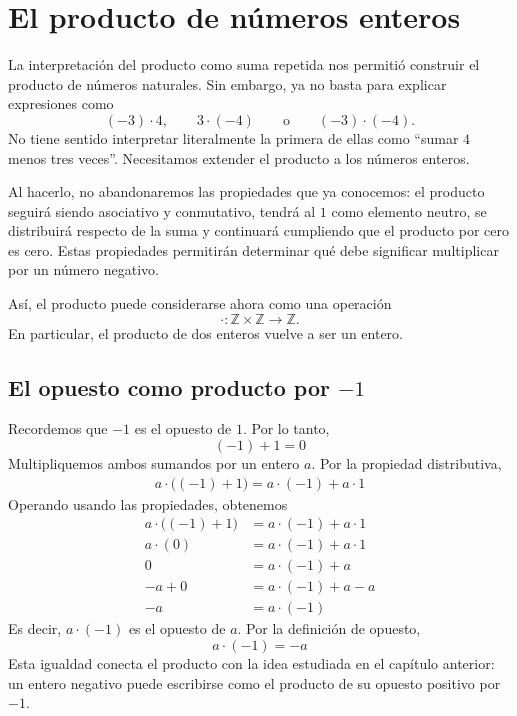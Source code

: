 \section{El producto de números enteros}

La interpretación del producto como suma repetida nos permitió construir el producto de números naturales. Sin embargo, ya no basta para explicar expresiones como
\[
(-3)\cdot4,
\qquad
3\cdot(-4)
\qquad\text{o}\qquad
(-3)\cdot(-4).
\]
No tiene sentido interpretar literalmente la primera de ellas como ``sumar \(4\) menos tres veces''. Necesitamos extender el producto a los números enteros.

Al hacerlo, no abandonaremos las propiedades que ya conocemos: el producto seguirá siendo asociativo y conmutativo, tendrá al \(1\) como elemento neutro, se distribuirá respecto de la suma y continuará cumpliendo que el producto por cero es cero. Estas propiedades permitirán determinar qué debe significar multiplicar por un número negativo.

Así, el producto puede considerarse ahora como una operación
\[
\cdot\colon\mathbb{Z}\times\mathbb{Z}\to\mathbb{Z}.
\]
En particular, el producto de dos enteros vuelve a ser un entero.

\subsection{El opuesto como producto por \texorpdfstring{\(-1\)}{-1}}

Recordemos que \(-1\) es el opuesto de \(1\). Por lo tanto,
\[
(-1)+1=0
\]
Multipliquemos ambos sumandos por un entero \(a\). Por la propiedad distributiva,
\begin{gather*}
a\cdot\bigl((-1)+1\bigr)
=a\cdot(-1)+a\cdot1
\end{gather*}
Operando usando las propiedades, obtenemos
\begin{align*}
  a\cdot\bigl((-1)+1\bigr) &= a\cdot(-1)+a\cdot 1 \\ 
  a \cdot (0) &= a\cdot(-1) + a\cdot1 \\ 
  0 &= a\cdot(-1) + a \\ 
  -a + 0 &= a\cdot(-1) +a - a \\ 
  -a &= a\cdot(-1)
\end{align*}
Es decir, \(a\cdot(-1)\) es el opuesto de \(a\). Por la definición de opuesto,
\[
\boxed{a\cdot(-1)=-a}
\]
Esta igualdad conecta el producto con la idea estudiada en el capítulo anterior: un entero negativo puede escribirse como el producto de su opuesto positivo por \(-1\).

